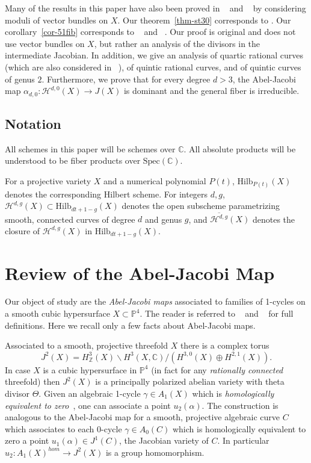 \documentclass[amssymb,twoside,12 pt,amscd,reqno]{amsart}
\theoremstyle{plain}
\theoremstyle{definition}
\newcommand{\Hdg}[2]{\mathcal{H}^{#1,#2}}
\newcommand{\ZZ}{\mathbb{Z}}
\newcommand{\CC}{\mathbb{C}}
\newcommand{\PP}{\mathbb{P}}
\newcommand{\HI}[2]{\text{Hilb}_{#1}(#2)}
\def\ps{\vspace{4pt}}
\newcommand{\lt}{\left}
\newcommand{\rt}{\right}
\begin{document}
\ps

Many of the results in this paper have also been proved in ~\cite{MT}
and ~\cite{AM} by considering moduli of vector bundles on $X$.  Our
theorem~\ref{thm-st30} corresponds to \cite[proposition 3.2]{MT}.  Our
corollary~\ref{cor-51fib} corresponds to ~\cite[theorem 5.6(iii)]{MT}
and ~\cite[theorem 3.2]{AM}.  Our proof is original and does not use
vector bundles on $X$, but rather an analysis of the divisors in the
intermediate Jacobian.  In addition, we give an analysis of quartic
rational curves (which are also considered in ~\cite{MT}), of quintic
rational curves, and of quintic curves of genus $2$.  Furthermore,
we prove that for every degree $d>3$, the
Abel-Jacobi map $\alpha_{d,0}:\Hdg{d}{0}(X)\rightarrow
J(X)$ is dominant and the general fiber is irreducible.

\subsection{Notation} \label{sec-not}

All schemes in this paper will be schemes over $\CC$.  All absolute
products will be understood to be fiber products over
$\text{Spec}(\CC)$.

\ps

For a projective variety $X$ and a numerical polynomial $P(t)$,
$\HI{P(t)}{X}$ denotes the corresponding Hilbert scheme.  For integers
$d,g$, $\Hdg{d}{g}(X)\subset \HI{dt+1-g}{X}$ denotes the open
subscheme parametrizing smooth, connected curves of degree $d$ and
genus $g$, and $\overline{\Hdg{d}{g}}(X)$ denotes the closure of
$\Hdg{d}{g}(X)$ in $\HI{dt+1-g}{X}$.
 

\section{Review of the Abel-Jacobi Map} \label{sec-rev}

Our object of study are the \emph{Abel-Jacobi maps} associated 
to families of 1-cycles on a smooth cubic hypersurface $X\subset
\PP^4$.  The reader is referred to ~\cite{CG} and ~\cite{VHS}
for full definitions.  Here we recall only a few facts
about Abel-Jacobi maps.

\ps

Associated to a smooth, projective threefold $X$ there is a complex
torus  
\begin{equation}
J^2(X) = H^3_\ZZ(X)\backslash H^3(X,\CC) / \lt(H^{3,0}(X)\oplus
H^{2,1}(X)\rt).
\end{equation}
In case $X$ is a cubic hypersurface in $\PP^4$ (in fact for any
\emph{rationally connected} threefold) then $J^2(X)$ is a principally
polarized
abelian variety with theta divisor $\Theta$.  Given an algebraic
1-cycle $\gamma\in A_1(X)$ which 
is \emph{homologically equivalent to zero}~\cite[13]{VHS}, one can
associate a point $u_2(\alpha)$.  The construction is analogous to
the Abel-Jacobi map for a smooth, projective algebraic curve $C$ which 
associates to each 0-cycle $\gamma\in A_0(C)$ which is homologically
equivalent to zero a point $u_1(\alpha)\in J^1(C)$, the Jacobian
variety of $C$.  In particular $u_2:A_1(X)^{hom}\rightarrow J^2(X)$ is 
a group homomorphism.
\end{document}
